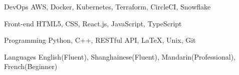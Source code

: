 

\begin{cvskills}

  \cvskill
    {DevOps} %
    {AWS, Docker, Kubernetes, Terraform, CircleCI, Snowflake} %

  \cvskill
    {Front-end} %
    {HTML5, CSS, React.js, JavaScript, TypeScript} %

  \cvskill
    {Programming} %
    {Python, C++, RESTful API, LaTeX, Unix, Git} %

  \cvskill
    {Languages} %
    {English(Fluent), Shanghainese(Fluent), Mandarin(Professional), French(Beginner)} %

\end{cvskills}
